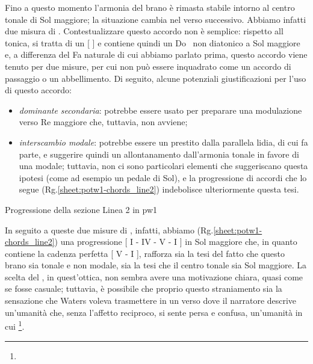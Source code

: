 \documentclass[class=book, crop=false, oneside, 12pt]{standalone}
\begin{document}
    Fino a questo momento l'armonia del brano è rimasta stabile intorno al centro tonale di Sol maggiore; la situazione cambia nel verso successivo. Abbiamo infatti due misura di . Contestualizzare questo accordo non è semplice: rispetto all tonica, si tratta di un [  ] e contiene quindi un Do\sharp~ non diatonico a Sol maggiore e, a differenza del Fa naturale di cui abbiamo parlato prima, questo accordo viene tenuto per due misure, per cui non può essere inquadrato come un accordo di passaggio o un abbellimento. Di seguito, alcune potenziali giustificazioni per l'uso di questo accordo:
    \begin{itemize}
        \item \emph{dominante secondaria}:  potrebbe essere usato per preparare una modulazione verso Re maggiore che, tuttavia, non avviene;
        \item \emph{interscambio modale}:  potrebbe essere un prestito dalla parallela lidia, di cui fa parte, e suggerire quindi un allontanamento dall'armonia tonale in favore di una modale; tuttavia, non ci sono particolari elementi che suggeriscano questa ipotesi (come ad esempio un pedale di Sol), e la progressione di accordi che lo segue (Rg.\ref{sheet:potw1-chords_line2}) indebolisce ulteriormente questa tesi.
    \end{itemize}

    \begin{sheet}[htbp]
        \centering
        \caption{Progressione della sezione Linea 2 in \acrshort{pw1}}
        \label{sheet:potw1-chords_line2}
    \end{sheet}

    In seguito a queste due misure di , infatti, abbiamo (Rg.\ref{sheet:potw1-chords_line2}) una progressione [ I - IV - V - I ] in Sol maggiore che, in quanto contiene la cadenza perfetta [ V - I ], rafforza sia la tesi del fatto che questo brano sia tonale e non modale, sia la tesi che il centro tonale sia Sol maggiore. La scelta del , in quest'ottica, non sembra avere una motivazione chiara, quasi come se fosse casuale; tuttavia, è possibile che proprio questo straniamento sia la sensazione che Waters voleva trasmettere in un verso dove il narratore descrive un'umanità che, senza l'affetto reciproco, si sente persa e confusa, un'umanità in cui \footnote{}.
\end{document}
